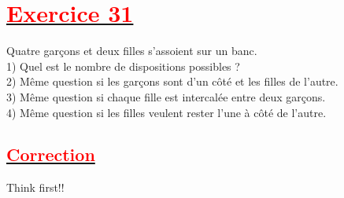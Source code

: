 \documentclass[12pt,a4paper]{article}
\begin{document}
\section*{\underline{\textbf{\textcolor{red}{Exercice 31}}}}
Quatre garçons et deux filles s’assoient sur un banc.\\
1) Quel est le nombre de dispositions possibles ?\\
2) Même question si les garçons sont d’un côté et les filles de l’autre.\\
3) Même question si chaque fille est intercalée entre deux garçons.\\
4) Même question si les filles veulent rester l’une à côté de l’autre.\\
\newpage
\begin{center}
\section*{\underline{\textbf{\textcolor{red}{Correction}}}}
Think first!!
\end{center}
\end{document}
